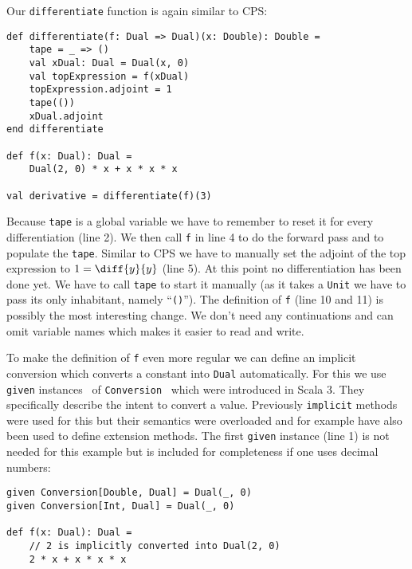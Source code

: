 Our \lstinline{differentiate} function is again similar to CPS:
\begin{lstlisting}
def differentiate(f: Dual => Dual)(x: Double): Double =
    tape = _ => ()
    val xDual: Dual = Dual(x, 0)
    val topExpression = f(xDual)
    topExpression.adjoint = 1
    tape(())
    xDual.adjoint
end differentiate

def f(x: Dual): Dual =
    Dual(2, 0) * x + x * x * x

val derivative = differentiate(f)(3)
\end{lstlisting}
Because \lstinline{tape} is a global variable we have to remember to reset it for every differentiation (line 2). We then call \lstinline{f} in line 4 to do the forward pass and to populate the \lstinline{tape}. Similar to CPS we have to manually set the adjoint of the top expression to $1 = \diff{y}{y}$ (line 5). At this point no differentiation has been done yet. We have to call \lstinline{tape} to start it manually (as it takes a \lstinline{Unit} we have to pass its only inhabitant, namely ``\lstinline{()}''). The definition of \lstinline{f} (line 10 and 11) is possibly the most interesting change. We don't need any continuations and can omit variable names which makes it easier to read and write.

To make the definition of \lstinline{f} even more regular we can define an implicit conversion which converts a constant into \lstinline{Dual} automatically. For this we use \lstinline{given} instances~\cite{givensScala3} of \lstinline{Conversion}~\cite{conversionsScala3} which were introduced in Scala 3. They specifically describe the intent to convert a value. Previously \lstinline{implicit} methods were used for this but their semantics were overloaded and for example have also been used to define extension methods. The first \lstinline{given} instance (line 1) is not needed for this example but is included for completeness if one uses decimal numbers:
\begin{lstlisting}
given Conversion[Double, Dual] = Dual(_, 0)
given Conversion[Int, Dual] = Dual(_, 0)

def f(x: Dual): Dual =
    // 2 is implicitly converted into Dual(2, 0)
    2 * x + x * x * x
\end{lstlisting}


